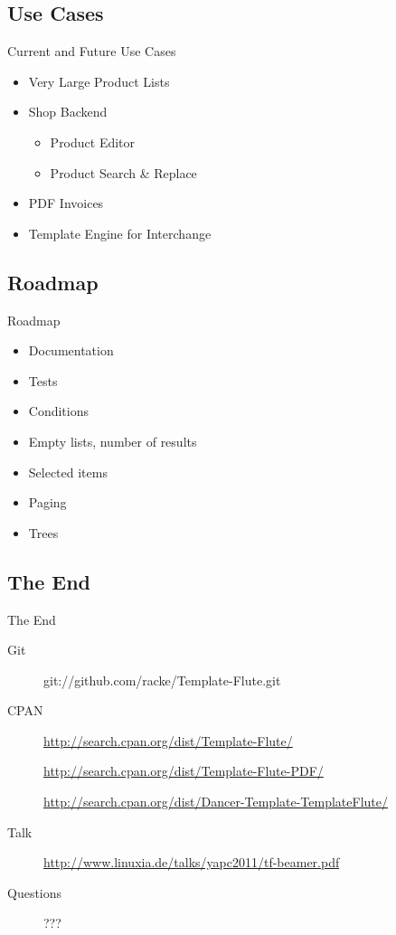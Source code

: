 \subsection{Use Cases}
\begin{frame}{Current and Future Use Cases}
  \begin{itemize}
  \item Very Large Product Lists
  \item Shop Backend
    \begin{itemize}
    \item Product Editor
    \item Product Search \& Replace
    \end{itemize}
  \item PDF Invoices
  \item Template Engine for Interchange
 \end{itemize}
\end{frame}

\subsection{Roadmap}
\begin{frame}{Roadmap}
 \begin{itemize}
   \item Documentation
   \item Tests
   \item Conditions
   \item Empty lists, number of results
   \item Selected items
   \item Paging
   \item Trees 
 \end{itemize}
\end{frame}

\subsection{The End}
\begin{frame}{The End}
 \begin{description}
  \item[Git] git://github.com/racke/Template-Flute.git
  \item[CPAN] \url{http://search.cpan.org/dist/Template-Flute/}
  \item[]   \url{http://search.cpan.org/dist/Template-Flute-PDF/}
  \item[]   \url{http://search.cpan.org/dist/Dancer-Template-TemplateFlute/}
  \item[Talk]
    \url{http://www.linuxia.de/talks/yapc2011/tf-beamer.pdf}
   \item[Questions] ???
 \end{description}
\end{frame}



